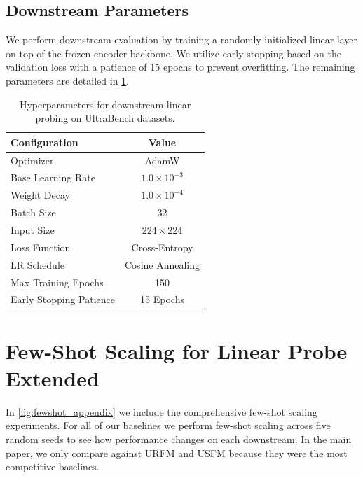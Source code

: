 \documentclass{article}
\theoremstyle{plain}
\theoremstyle{definition}
\theoremstyle{remark}
\begin{document}
\subsection{Downstream Parameters}\label{app:D.2}

We perform downstream evaluation by training a randomly initialized linear layer on top of the frozen encoder backbone. We utilize early stopping based on the validation loss with a patience of 15 epochs to prevent overfitting. The remaining parameters are detailed in \cref{tab:linear_probing_params}.

\begin{table}[t]
  \caption{Hyperparameters for downstream linear probing on UltraBench datasets.}
  \label{tab:linear_probing_params}
  \begin{center}
    \begin{small}
      \begin{sc}
        \begin{tabular}{lc}
          \toprule
          \textbf{Configuration} & \textbf{Value} \\ 
          \midrule
          Optimizer & AdamW \\
          Base Learning Rate & $1.0 \times 10^{-3}$ \\
          Weight Decay & $1.0 \times 10^{-4}$ \\
          Batch Size & 32 \\
          Input Size & $224 \times 224$ \\
          Loss Function & Cross-Entropy \\
          LR Schedule & Cosine Annealing \\
          Max Training Epochs & 150 \\
          Early Stopping Patience & 15 Epochs \\ 
          \bottomrule
        \end{tabular}
      \end{sc}
    \end{small}
  \end{center}
  \vskip -0.1in
\end{table}

\section{Few-Shot Scaling for Linear Probe Extended}\label{app:E}

In \cref{fig:fewshot_appendix} we include the comprehensive few-shot scaling experiments. For all of our baselines we perform few-shot scaling across five random seeds to see how performance changes on each downstream. In the main paper, we only compare against URFM and USFM  because they were the most competitive baselines.
\end{document}

